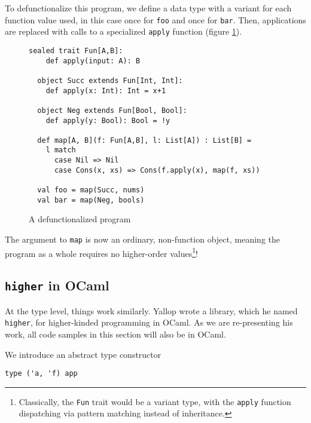 \documentclass[acmsmall,screen]{acmart}
\begin{document}
To defunctionalize this program, we define a data type with a variant for each
function value used, in this case once for \texttt{foo} and once for
\texttt{bar}. Then, applications are replaced with calls to a specialized
\texttt{apply} function (figure \ref{fig::defun-post}).

\begin{figure}
  \begin{lstlisting}[style=scala]
  sealed trait Fun[A,B]:
    def apply(input: A): B

  object Succ extends Fun[Int, Int]:
    def apply(x: Int): Int = x+1

  object Neg extends Fun[Bool, Bool]:
    def apply(y: Bool): Bool = !y

  def map[A, B](f: Fun[A,B], l: List[A]) : List[B] =
    l match
      case Nil => Nil
      case Cons(x, xs) => Cons(f.apply(x), map(f, xs))

  val foo = map(Succ, nums)
  val bar = map(Neg, bools)
  \end{lstlisting}
  \caption{A defunctionalized program}\label{fig::defun-post}
\end{figure}

The argument to \texttt{map} is now an ordinary, non-function object, meaning
the program as a whole requires no higher-order values\footnote{Classically,
the \texttt{Fun} trait would be a variant type, with the \texttt{apply}
function dispatching via pattern matching instead of inheritance.}!

\subsection{\texttt{higher} in OCaml}

At the type level, things work similarly. Yallop wrote a library, which he
named \texttt{higher}, for higher-kinded programming in OCaml. As we are
re-presenting his work, all code samples in this section will also be in
OCaml.

We introduce an abstract type constructor
\begin{lstlisting}[style=ocaml]
  type ('a, 'f) app
\end{lstlisting}
\end{document}
